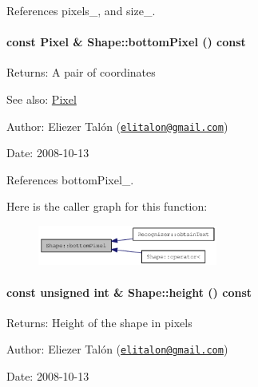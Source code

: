 References pixels\_\-, and size\_\-.\hypertarget{class_shape_99293804122214fa366d7f7ae794d077}{
\paragraph[{bottomPixel}]{\setlength{\rightskip}{0pt plus 5cm}const {\bf Pixel} \& Shape::bottomPixel () const}\hfill}
\label{class_shape_99293804122214fa366d7f7ae794d077}


\begin{Desc}
\item[Returns:]A pair of coordinates\end{Desc}
\begin{Desc}
\item[See also:]\hyperlink{_shape_8hpp_535e59456e3e633842529cfa8ea103c4}{Pixel}\end{Desc}
\begin{Desc}
\item[Author:]Eliezer Talón (\href{mailto:elitalon@gmail.com}{\tt elitalon@gmail.com}) \end{Desc}
\begin{Desc}
\item[Date:]2008-10-13 \end{Desc}


References bottomPixel\_\-.

Here is the caller graph for this function:\nopagebreak
\begin{figure}[H]
\begin{center}
\leavevmode
\includegraphics[width=167pt]{class_shape_99293804122214fa366d7f7ae794d077_icgraph}
\end{center}
\end{figure}
\hypertarget{class_shape_8400155046b2190bce621f8f366ef2be}{
\paragraph[{height}]{\setlength{\rightskip}{0pt plus 5cm}const unsigned int \& Shape::height () const}\hfill}
\label{class_shape_8400155046b2190bce621f8f366ef2be}


\begin{Desc}
\item[Returns:]Height of the shape in pixels\end{Desc}
\begin{Desc}
\item[Author:]Eliezer Talón (\href{mailto:elitalon@gmail.com}{\tt elitalon@gmail.com}) \end{Desc}
\begin{Desc}
\item[Date:]2008-10-13 \end{Desc}



